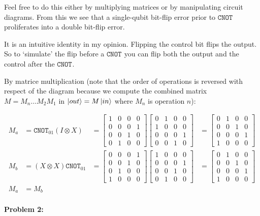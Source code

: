 \documentclass[12pt]{article}
\newcommand{\bmat}[1]{\begin{bmatrix}#1\end{bmatrix}}
\newenvironment{answer}{\begingroup\setlength{\leftskip}{-\leftmargin}\begin{framed}}{\end{framed}\endgroup}
\newcommand{\CNOT}[1]{\ensuremath{\texttt{CNOT}_{#1}}}
\begin{document}
\begin{enumerate}
    Feel free to do this either by multiplying matrices or by manipulating circuit diagrams. From this we see that a single-qubit bit-flip error prior to \CNOT{} proliferates into a double bit-flip error.

    \begin{answer}
        It is an intuitive identity in my opinion. Flipping the control bit flips the output. So to `simulate' the flip before a \CNOT{} you can flip both the output and the control after the \CNOT{}.

        By matrice multiplication (note that the order of operations is reversed with respect of the diagram because we compute the combined matrix $M = M_n\dots{}M_2M_1$ in $\ket{out} = M\ket{in}$ where $M_n$ is operation $n$):

        \begin{align*}
            M_a &= \CNOT{01}(I \otimes X) &=
                \bmat{1&0&0&0\\0&0&0&1\\0&0&1&0\\0&1&0&0}
                \bmat{0&1&0&0\\1&0&0&0\\0&0&0&1\\0&0&1&0} &=
                \bmat{0&1&0&0\\0&0&1&0\\0&0&0&1\\1&0&0&0}\\
            M_b &= (X \otimes X)\CNOT{01} &=
                \bmat{0&0&0&1\\0&0&1&0\\0&1&0&0\\1&0&0&0}
                \bmat{1&0&0&0\\0&0&0&1\\0&0&1&0\\0&1&0&0} &=
                \bmat{0&1&0&0\\0&0&1&0\\0&0&0&1\\1&0&0&0}\\
            M_a &= M_b
        \end{align*}
    \end{answer}
\end{enumerate}

\paragraph{Problem 2: }
\end{document}
